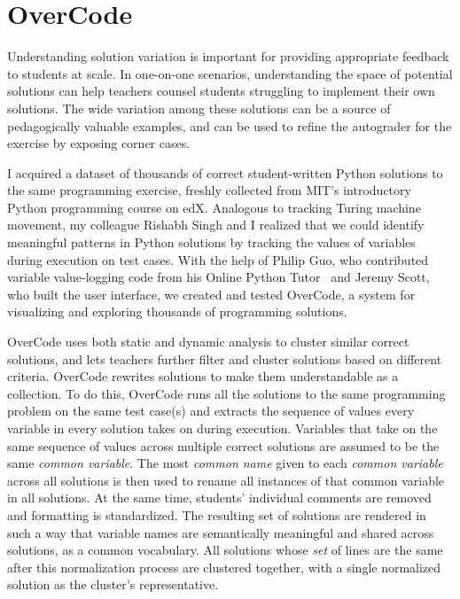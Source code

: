 \section{OverCode}

Understanding solution variation is important for providing appropriate feedback to students at scale. In one-on-one scenarios, understanding the space of potential solutions can help teachers counsel students struggling to implement their own solutions. The wide variation among these solutions can be a source of pedagogically valuable examples, and can be used to refine the autograder for the exercise by exposing corner cases. 

I acquired a dataset of thousands of correct student-written Python solutions to the same programming exercise, freshly collected from MIT's introductory Python programming course on edX. Analogous to tracking Turing machine movement, my colleague Rishabh Singh and I realized that we could identify meaningful patterns in Python solutions by tracking the values of variables during execution on test cases. With the help of Philip Guo, who contributed variable value-logging code from his Online Python Tutor~\cite{pgbovineOPT} and Jeremy Scott, who built the user interface, we created and tested OverCode, a system for visualizing and exploring thousands of programming solutions.

OverCode uses both static and dynamic analysis to cluster similar correct solutions, and lets teachers further filter and cluster solutions based on different criteria. OverCode rewrites solutions to make them understandable as a collection. To do this, OverCode runs all the solutions to the same programming problem on the same test case(s) and extracts the sequence of values every variable in every solution takes on during execution. Variables that take on the same sequence of values across multiple correct solutions are assumed to be the same {\it common variable}. The most {\it common name} given to each {\it common variable} across all solutions is then used to rename all instances of that common variable in all solutions. At the same time, students' individual comments are removed and formatting is standardized. The resulting set of solutions are rendered in such a way that variable names are semantically meaningful and shared across solutions, as a common vocabulary. All solutions whose {\it set} of lines are the same after this normalization process are clustered together, with a single normalized solution as the cluster's representative.

